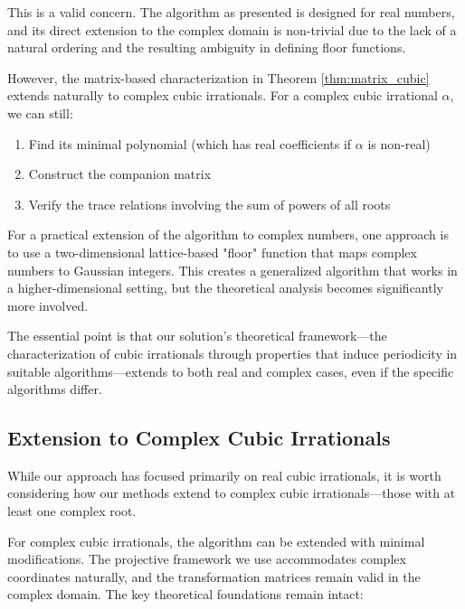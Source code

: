 \begin{response}
This is a valid concern. The \HAPD{} algorithm as presented is designed for real numbers, and its direct extension to the complex domain is non-trivial due to the lack of a natural ordering and the resulting ambiguity in defining floor functions.

However, the matrix-based characterization in Theorem \ref{thm:matrix_cubic} extends naturally to complex cubic irrationals. For a complex cubic irrational $\alpha$, we can still:
\begin{enumerate}
    \item Find its minimal polynomial (which has real coefficients if $\alpha$ is non-real)
    \item Construct the companion matrix
    \item Verify the trace relations involving the sum of powers of all roots
\end{enumerate}

For a practical extension of the \HAPD{} algorithm to complex numbers, one approach is to use a two-dimensional lattice-based "floor" function that maps complex numbers to Gaussian integers. This creates a generalized \HAPD{} algorithm that works in a higher-dimensional setting, but the theoretical analysis becomes significantly more involved.

The essential point is that our solution's theoretical framework—the characterization of cubic irrationals through properties that induce periodicity in suitable algorithms—extends to both real and complex cases, even if the specific algorithms differ.
\end{response}

\subsection{Extension to Complex Cubic Irrationals}

While our approach has focused primarily on real cubic irrationals, it is worth considering how our methods extend to complex cubic irrationals—those with at least one complex root.

For complex cubic irrationals, the \HAPD{} algorithm can be extended with minimal modifications. The projective framework we use accommodates complex coordinates naturally, and the transformation matrices remain valid in the complex domain. The key theoretical foundations remain intact:


